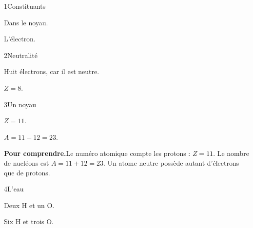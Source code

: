 \par\noindent\begin{minipage}{\linewidth}
\begin{corrige}{1}{Constituants}
\begin{questions}
\item Dans le noyau.
\item L’électron.
\end{questions}
\end{corrige}
\end{minipage}
\par\noindent\begin{minipage}{\linewidth}
\begin{corrige}{2}{Neutralité}
\begin{questions}
\item Huit électrons, car il est neutre.
\item $Z=8$.
\end{questions}
\end{corrige}
\end{minipage}
\par\noindent\begin{minipage}{\linewidth}
\begin{corrige}{3}{Un noyau}
\begin{questions}
\item $Z=11$.
\item $A=11+12=23$.
\end{questions}
\par\smallskip\noindent\textbf{Pour comprendre.}\enspace Le numéro atomique compte les protons : $Z=11$. Le nombre de nucléons est $A=11+12=23$. Un atome neutre possède autant d’électrons que de protons.\par
{}
\end{corrige}
\end{minipage}
\par\noindent\begin{minipage}{\linewidth}
\begin{corrige}{4}{L’eau}
\begin{questions}
\item Deux H et un O.
\item Six H et trois O.
\end{questions}
\end{corrige}
\end{minipage}
